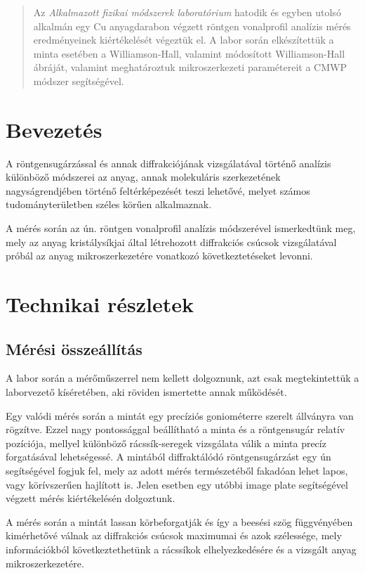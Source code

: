 \begin{abstract}
    \noindent Az \emph{Alkalmazott fizikai módszerek laboratórium} hatodik és egyben utolsó alkalmán egy Cu anyagdarabon végzett röntgen vonalprofil analízis mérés eredményeinek kiértékelését végeztük el. A labor során elkészítettük a minta esetében a Williamson-Hall, valamint módosított Williamson-Hall ábráját, valamint meghatároztuk mikroszerkezeti paramétereit a CMWP módszer segítségével.
\end{abstract}

\begin{multicols}{2}
\section{Bevezetés}
A röntgensugárzással és annak diffrakciójának vizsgálatával történő analízis különböző módszerei az anyag, annak molekuláris szerkezetének nagyságrendjében történő feltérképezését teszi lehetővé, melyet számos tudományterületben széles körűen alkalmaznak. \par
A mérés során az ún. röntgen vonalprofil analízis módszerével ismerkedtünk meg, mely az anyag kristálysíkjai által létrehozott diffrakciós csúcsok vizsgálatával próbál az anyag mikroszerkezetére vonatkozó következtetéseket levonni.

\section{Technikai részletek}
\subsection{Mérési összeállítás}
A labor során a mérőműszerrel nem kellett dolgoznunk, azt csak megtekintettük a laborvezető kíséretében, aki röviden ismertette annak működését. \par
Egy valódi mérés során a mintát egy precíziós goniométerre szerelt állványra van rögzítve. Ezzel nagy pontossággal beállítható a minta és a röntgensugár relatív pozíciója, mellyel különböző rácssík-seregek vizsgálata válik a minta precíz forgatásával lehetségessé. A mintából diffraktálódó röntgensugárzást egy ún  segítségével fogjuk fel, mely az adott mérés természetéből fakadóan lehet lapos, vagy körívszerűen hajlított is. Jelen esetben egy utóbbi image plate segítségével végzett mérés kiértékelésén dolgoztunk. \par
A mérés során a mintát lassan körbeforgatják és így a beesési szög függvényében kimérhetővé válnak az diffrakciós csúcsok maximumai és azok szélessége, mely információkból következtethetünk a rácssíkok elhelyezkedésére és a vizsgált anyag mikroszerkezetére.


\end{multicols}
